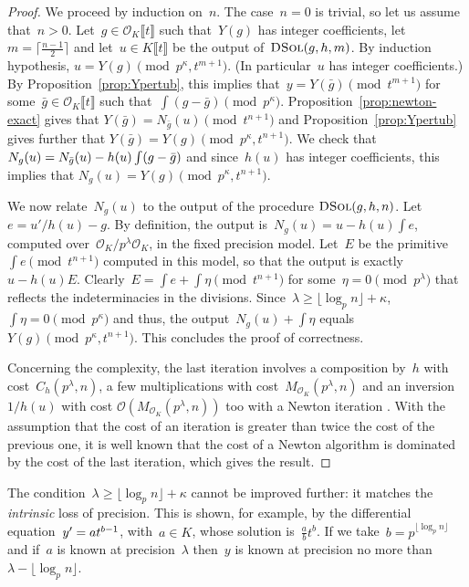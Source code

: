 \documentclass{sig-alternate}
\theoremstyle{definition}
\theoremstyle{remark}
\newcommand\cO{\mathcal{O}}
\newcommand\Opt{\cO_K \llbracket t \rrbracket}
\newcommand\Kpt{K\llbracket t \rrbracket}
\def\geq{\geqslant}
\def\smallint{\begingroup\textstyle \int\endgroup}
\begin{document}
\begin{proof}
  We proceed by induction on~$n$. The case~$n=0$ is trivial, so let us assume that~$n>0$.  Let~$g \in \Opt$ such that~$Y(g)$ has integer coefficients,
  let~$m = \lceil \frac{n-1}{2} \rceil$ and let~$u\in\Kpt$ be the output of~$\textsc{DSol}(g, h,
  m)$.  By induction hypothesis, $u = Y(g)
  \pmod{p^\kappa, t^{m+1}}$. (In particular~$u$ has integer coefficients.)
  By Proposition~\ref{prop:Ypertub}, this implies that~$y = Y(\bar g) \pmod{t^{m+1}}$
  for some~$\bar g\in \Opt$ such that~$\int(g - \bar g) \pmod{p^\kappa}$.
Proposition~\ref{prop:newton-exact} gives that $Y(\bar g) = N_{\bar g}(u) \pmod{t^{n+1}}$
  and Proposition~\ref{prop:Ypertub} gives further that $Y(\bar g) = Y(g) \pmod{p^\kappa, t^{n+1}}$.
We check that
  $N_g(u) = N_{\bar g}(u) - h(u) \smallint(g - \bar g)$
  and since~$h(u)$ has integer coefficients, this implies that
  $N_g(u) = Y(g) \pmod{p^\kappa, t^{n+1}}$.
  
  We now relate~$N_g(u)$ to the output of the procedure $\textsc{DSol}(g, h, n)$.
  Let~$e = u'/h(u) - g$.
  By definition, the output is~$N_{g}(u)  = u - h(u) \int e$, computed
  over~$\cO_K/p^\lambda\cO_K$, in the fixed precision model.  Let~$E$
  be the primitive~$\int e \pmod{t^{n+1}}$ computed in this model, so that the
  output is exactly~$u - h(u)E$.  Clearly~$E = \int e + \int \eta
  \pmod{t^{n+1}}$ for some~$\eta = 0 \pmod{p^\lambda}$ that reflects the
  indeterminacies in the divisions.
  Since~$\lambda \geq \lfloor \log_p n \rfloor + \kappa$, $\int\eta = 0 \pmod{p^\kappa}$ and
  thus, the output~$N_g(u) + \int \eta$ equals~$Y(g) \pmod{p^\kappa, t^{n+1}}$.
  This concludes the proof of correctness.

  Concerning the complexity, the last iteration involves a composition by~$h$
  with cost~$C_h(p^\lambda, n)$, a few multiplications with
  cost~$M_{\cO_K}(p^\lambda,n)$ and an inversion~$1/h(u)$ with cost
  $\cO\left(M_{\cO_K}(p^\lambda,n)\right)$ too with a Newton iteration
  \parencite{Kun74}.  With the assumption that the cost of an iteration is
  greater than twice the cost of the previous one, it is well known that the cost
  of a Newton algorithm is dominated by the cost of the last iteration, which gives the result.
\end{proof}

The condition~$\lambda \geq \lfloor \log_p n \rfloor + \kappa$ cannot be improved further: it matches the \emph{intrinsic} loss of precision. This is shown, for example, by the differential equation~$y' = \smash{at^{b-1}}$, with~$a\in K$, whose solution is~$\frac ab t^b$. If we take~$b = p^{\lfloor \log_p n \rfloor}$ and if~$a$ is known at precision~$\lambda$ then~$y$ is known at precision no more than~$\lambda - \lfloor \log_p n \rfloor$.
\end{document}
